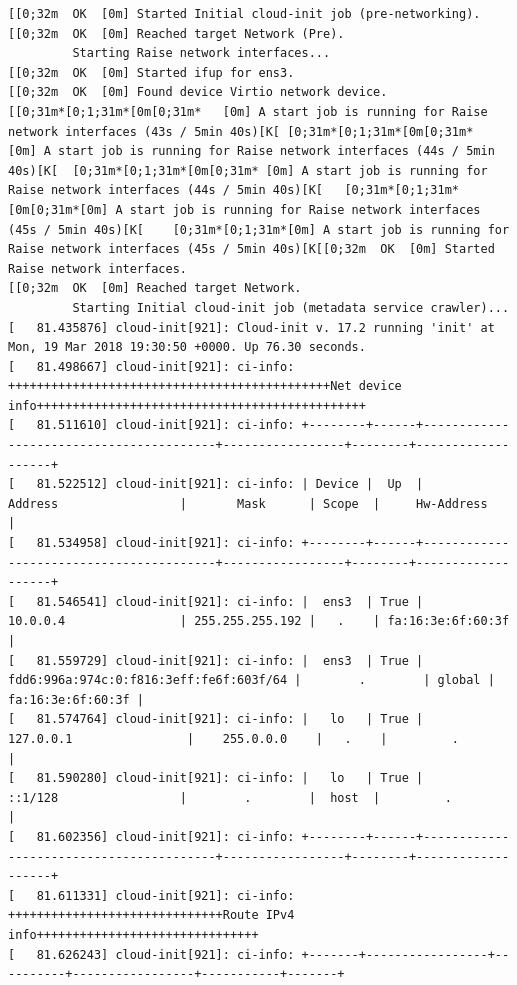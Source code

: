\documentclass[12pt]{article}
\begin{document}
\begin{verbatim}
[[0;32m  OK  [0m] Started Initial cloud-init job (pre-networking).
[[0;32m  OK  [0m] Reached target Network (Pre).
         Starting Raise network interfaces...
[[0;32m  OK  [0m] Started ifup for ens3.
[[0;32m  OK  [0m] Found device Virtio network device.
[[0;31m*[0;1;31m*[0m[0;31m*   [0m] A start job is running for Raise network interfaces (43s / 5min 40s)[K[ [0;31m*[0;1;31m*[0m[0;31m*  [0m] A start job is running for Raise network interfaces (44s / 5min 40s)[K[  [0;31m*[0;1;31m*[0m[0;31m* [0m] A start job is running for Raise network interfaces (44s / 5min 40s)[K[   [0;31m*[0;1;31m*[0m[0;31m*[0m] A start job is running for Raise network interfaces (45s / 5min 40s)[K[    [0;31m*[0;1;31m*[0m] A start job is running for Raise network interfaces (45s / 5min 40s)[K[[0;32m  OK  [0m] Started Raise network interfaces.
[[0;32m  OK  [0m] Reached target Network.
         Starting Initial cloud-init job (metadata service crawler)...
[   81.435876] cloud-init[921]: Cloud-init v. 17.2 running 'init' at Mon, 19 Mar 2018 19:30:50 +0000. Up 76.30 seconds.
[   81.498667] cloud-init[921]: ci-info: +++++++++++++++++++++++++++++++++++++++++++++Net device info++++++++++++++++++++++++++++++++++++++++++++++
[   81.511610] cloud-init[921]: ci-info: +--------+------+-----------------------------------------+-----------------+--------+-------------------+
[   81.522512] cloud-init[921]: ci-info: | Device |  Up  |                 Address                 |       Mask      | Scope  |     Hw-Address    |
[   81.534958] cloud-init[921]: ci-info: +--------+------+-----------------------------------------+-----------------+--------+-------------------+
[   81.546541] cloud-init[921]: ci-info: |  ens3  | True |                 10.0.0.4                | 255.255.255.192 |   .    | fa:16:3e:6f:60:3f |
[   81.559729] cloud-init[921]: ci-info: |  ens3  | True | fdd6:996a:974c:0:f816:3eff:fe6f:603f/64 |        .        | global | fa:16:3e:6f:60:3f |
[   81.574764] cloud-init[921]: ci-info: |   lo   | True |                127.0.0.1                |    255.0.0.0    |   .    |         .         |
[   81.590280] cloud-init[921]: ci-info: |   lo   | True |                 ::1/128                 |        .        |  host  |         .         |
[   81.602356] cloud-init[921]: ci-info: +--------+------+-----------------------------------------+-----------------+--------+-------------------+
[   81.611331] cloud-init[921]: ci-info: ++++++++++++++++++++++++++++++Route IPv4 info+++++++++++++++++++++++++++++++
[   81.626243] cloud-init[921]: ci-info: +-------+-----------------+----------+-----------------+-----------+-------+

\end{verbatim}
\end{document}
